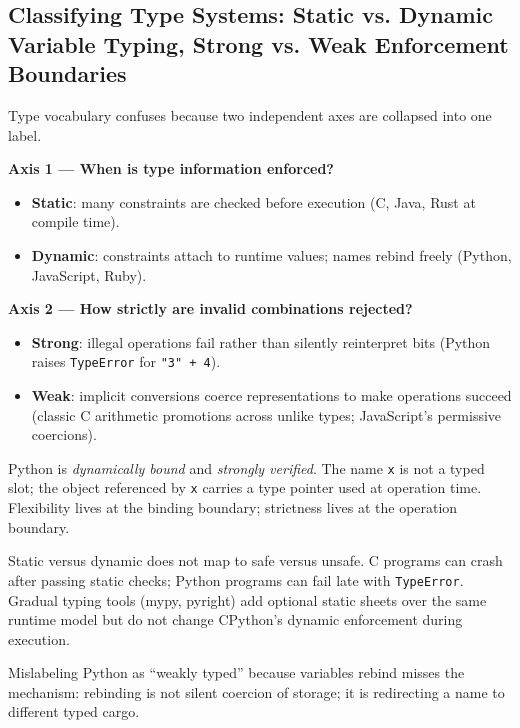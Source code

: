 \subsection{Classifying Type Systems: Static vs. Dynamic Variable Typing, Strong vs. Weak Enforcement Boundaries}

Type vocabulary confuses because two independent axes are collapsed into one label.

\textbf{Axis 1 --- When is type information enforced?}

\begin{itemize}
    \item \textbf{Static}: many constraints are checked before execution (C, Java, Rust at compile time).
    \item \textbf{Dynamic}: constraints attach to runtime values; names rebind freely (Python, JavaScript, Ruby).
\end{itemize}

\textbf{Axis 2 --- How strictly are invalid combinations rejected?}

\begin{itemize}
    \item \textbf{Strong}: illegal operations fail rather than silently reinterpret bits (Python raises \texttt{TypeError} for \texttt{"3" + 4}).
    \item \textbf{Weak}: implicit conversions coerce representations to make operations succeed (classic C arithmetic promotions across unlike types; JavaScript's permissive coercions).
\end{itemize}

Python is \emph{dynamically bound} and \emph{strongly verified}. The name \texttt{x} is not a typed slot; the object referenced by \texttt{x} carries a type pointer used at operation time. Flexibility lives at the binding boundary; strictness lives at the operation boundary.

Static versus dynamic does not map to safe versus unsafe. C programs can crash after passing static checks; Python programs can fail late with \texttt{TypeError}. Gradual typing tools (mypy, pyright) add optional static sheets over the same runtime model but do not change CPython's dynamic enforcement during execution.

Mislabeling Python as ``weakly typed'' because variables rebind misses the mechanism: rebinding is not silent coercion of storage; it is redirecting a name to different typed cargo.
